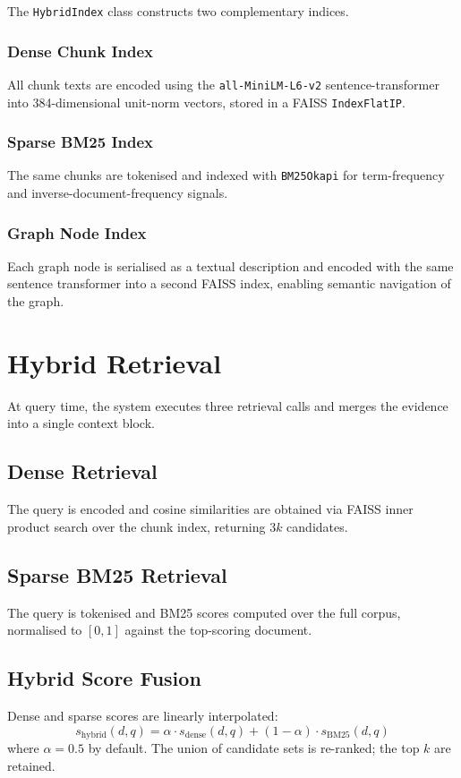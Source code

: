 \documentclass[conference]{IEEEtran}
\begin{document}
The \texttt{HybridIndex} class constructs two complementary indices.

\subsubsection{Dense Chunk Index}
All chunk texts are encoded using the \texttt{all-MiniLM-L6-v2}
sentence-transformer \cite{reimers2019sbert} into 384-dimensional
unit-norm vectors, stored in a FAISS \texttt{IndexFlatIP}.

\subsubsection{Sparse BM25 Index}
The same chunks are tokenised and indexed with \texttt{BM25Okapi}
\cite{robertson2009probabilistic} for term-frequency and
inverse-document-frequency signals.

\subsubsection{Graph Node Index}
Each graph node is serialised as a textual description and encoded
with the same sentence transformer into a second FAISS index, enabling
semantic navigation of the graph.

\section{Hybrid Retrieval}
\label{sec:retrieval}

At query time, the system executes three retrieval calls and merges the
evidence into a single context block.

\subsection{Dense Retrieval}
The query is encoded and cosine similarities are obtained via FAISS
inner product search over the chunk index, returning $3k$ candidates.

\subsection{Sparse BM25 Retrieval}
The query is tokenised and BM25 scores computed over the full corpus,
normalised to $[0, 1]$ against the top-scoring document.

\subsection{Hybrid Score Fusion}
Dense and sparse scores are linearly interpolated:
\begin{equation}
  s_\text{hybrid}(d, q) = \alpha \cdot s_\text{dense}(d, q)
                        + (1 - \alpha) \cdot s_\text{BM25}(d, q)
  \label{eq:fusion}
\end{equation}
where $\alpha = 0.5$ by default. The union of candidate sets is
re-ranked; the top $k$ are retained.
\end{document}
